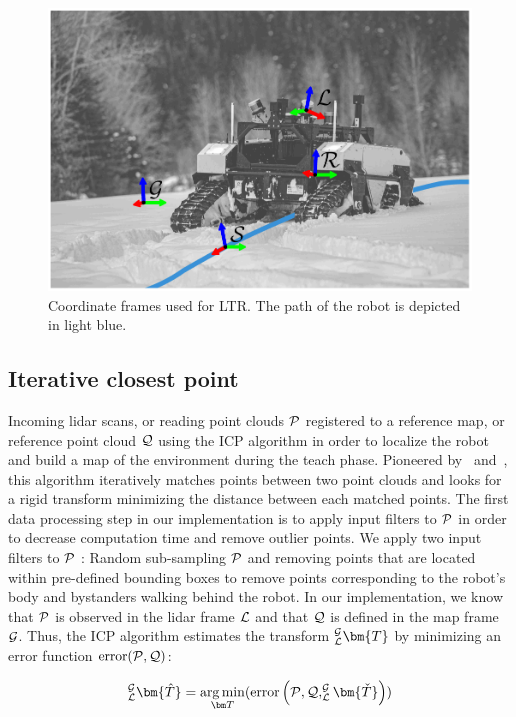 \begin{figure} [htpb]
	\centering
	\includegraphics[width=.6\linewidth]{figs/warthog_frames/warthog_frames.pdf}
	\caption{Coordinate frames used for \ac{LTR}. The path of the robot is depicted in light blue. }
	\label{fig:ltr_frames}
\end{figure}

\subsection{Iterative closest point}
\label{ICP}

Incoming lidar scans, or reading point clouds $\mathcal{P}$ registered to a reference map, or reference point cloud $\mathcal{Q}$ using the \ac{ICP} algorithm in order to localize the robot and build a map of the environment during the teach phase.
Pioneered by~\citet{Besl1992} and~\citet{Chen1991}, this algorithm iteratively matches points between two point clouds and looks for a rigid transform minimizing the distance between each matched points.
The first data processing step in our implementation is to apply input filters to $\mathcal{P}$ in order to decrease computation time and remove outlier points.
We apply two input filters to $\mathcal{P}$ : Random sub-sampling $\mathcal{P}$ and removing points that are located within pre-defined bounding boxes to remove points corresponding to the robot's body and bystanders walking behind the robot.
In our implementation, we know that $\mathcal{P}$ is observed in the lidar frame $\mathcal{L}$ and that $\mathcal{Q}$ is defined in the map frame $\mathcal{G}$.
Thus, the \ac{ICP} algorithm estimates the transform $_{\lidarf}^{\mapf}\bm{T}$ by minimizing an error function $\text{error}(\mathcal{P}, \mathcal{Q})$:

\begin{equation}
	_{\lidarf}^{\mapf}\bm{\hat{T}} = \argmin_{\bm T} (\text{error} \left(\readpc, \refpc, _{\lidarf}^{\mapf}\bm{\check{T}} \right))
\end{equation}

